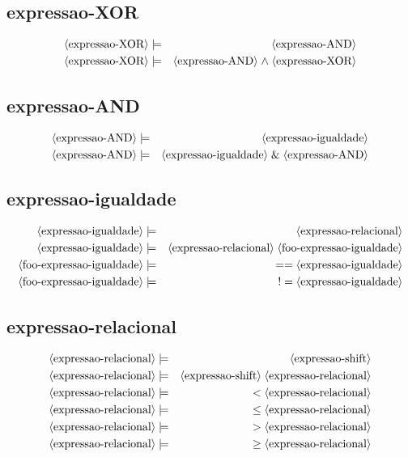 \documentclass[12pt,a4papper]{article}
\newcommand{\pn}[1]{\langle \textnormal{#1} \rangle}
\newcommand{\pp}{\models}
\newcommand{\ww}{\;}
\newcommand{\sm}[1]{\textnormal{#1}}
\begin{document}
\begin{landscape}
\subsection{expressao-XOR}
\begin{eqnarray}
\pn{expressao-XOR} &\pp& \pn{expressao-AND} \\
\pn{expressao-XOR} &\pp& \pn{expressao-AND} \ww \sm{$\wedge$} \ww \pn{expressao-XOR} 
\end{eqnarray}


\subsection{expressao-AND}
\begin{eqnarray}
\pn{expressao-AND} &\pp& \pn{expressao-igualdade} \\
\pn{expressao-AND} &\pp& \pn{expressao-igualdade} \ww \sm{\&} \ww \pn{expressao-AND}
\end{eqnarray}


\subsection{expressao-igualdade}
\begin{eqnarray}
\pn{expressao-igualdade} &\pp& \pn{expressao-relacional} \\
\pn{expressao-igualdade} &\pp& \pn{expressao-relacional} \ww \pn{foo-expressao-igualdade} \\
              \pn{foo-expressao-igualdade} &\pp& \sm{$==$} \ww \pn{expressao-igualdade} \\
              \pn{foo-expressao-igualdade} &\pp& \sm{$!=$} \ww \pn{expressao-igualdade}
\end{eqnarray}


\subsection{expressao-relacional}
\begin{eqnarray}
\pn{expressao-relacional} &\pp& \pn{expressao-shift} \\
\pn{expressao-relacional} &\pp& \pn{expressao-shift} \ww \pn{expressao-relacional} \\
              \pn{expressao-relacional} &\pp& \sm{$<$} \ww \pn{expressao-relacional} \\
              \pn{expressao-relacional} &\pp& \sm{$\leq$} \ww \pn{expressao-relacional} \\
              \pn{expressao-relacional} &\pp& \sm{$>$} \ww \pn{expressao-relacional} \\
              \pn{expressao-relacional} &\pp& \sm{$\geq$} \ww \pn{expressao-relacional}
\end{eqnarray}


\end{landscape}
\end{document}
